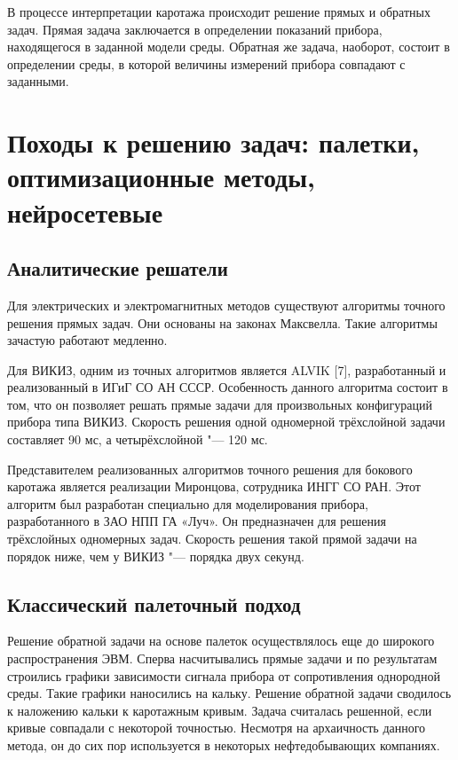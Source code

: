 В процессе интерпретации каротажа происходит решение прямых и обратных
задач. Прямая задача заключается в определении показаний прибора,
находящегося в заданной модели среды. Обратная же задача, наоборот, состоит
в определении среды, в которой величины измерений прибора совпадают с
заданными.

\section{Походы к решению задач: палетки, оптимизационные методы, нейросетевые} \label{sect1_1}

\subsection{Аналитические решатели} \label{subsect1_1_1}
Для электрических и электромагнитных методов существуют алгоритмы точного
решения прямых задач. Они основаны на законах Максвелла. Такие алгоритмы
зачастую работают медленно.

Для ВИКИЗ, одним из точных алгоритмов является ALVIK [7], разработанный и
реализованный в ИГиГ СО АН СССР. Особенность данного алгоритма состоит в
том, что он позволяет решать прямые задачи для произвольных конфигураций
прибора типа ВИКИЗ. Скорость решения одной одномерной трёхслойной задачи
составляет 90 мс, а четырёхслойной "---  120 мс.

Представителем реализованных алгоритмов точного решения для бокового
каротажа является реализации Миронцова, сотрудника ИНГГ СО РАН. Этот
алгоритм был разработан специально для моделирования прибора,
разработанного в ЗАО НПП ГА «Луч». Он предназначен для решения трёхслойных
одномерных задач. Скорость решения такой прямой задачи на порядок ниже, чем
у ВИКИЗ "--- порядка двух секунд.

\subsection{Классический палеточный подход} \label{subsect1_1_2}
Решение обратной задачи на основе палеток осуществлялось еще до широкого
распространения ЭВМ. Сперва насчитывались прямые задачи и по результатам
строились графики зависимости сигнала прибора от сопротивления однородной
среды. Такие  графики наносились на кальку. Решение обратной задачи
сводилось к наложению кальки к каротажным кривым. Задача считалась
решенной, если кривые совпадали с некоторой точностью. Несмотря на
архаичность данного метода, он до сих пор используется в некоторых
нефтедобывающих компаниях.

